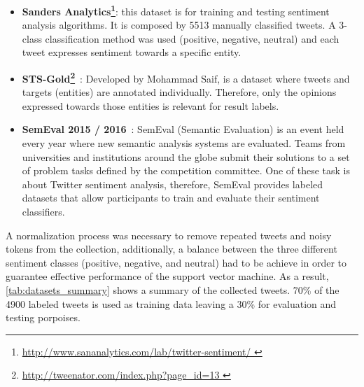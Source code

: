 \begin{itemize} 
\itemsep0em  

\item \textbf{Sanders Analytics\footnote{\url{http://www.sananalytics.com/lab/twitter-sentiment/
}}}:  this dataset is for training and testing sentiment analysis algorithms. It is composed by 5513 manually classified tweets. A 3-class classification method was used (positive, negative, neutral) and each tweet expresses sentiment towards a specific entity.  

\item \textbf{STS-Gold\footnote{\url{http://tweenator.com/index.php?page_id=13
}}}~\cite{saif2013evaluation}: Developed by Mohammad Saif, is a dataset where tweets and targets (entities) are annotated individually. Therefore, only the opinions expressed towards those entities is relevant for result labels.

\item \textbf{SemEval 2015 / 2016}~\cite{rosenthal2015semeval}: SemEval (Semantic Evaluation) is an event held every year where new semantic analysis systems are evaluated. Teams from universities and institutions around the globe submit their solutions to a set of problem tasks defined by the competition committee. One of these task is about Twitter sentiment analysis, therefore, SemEval provides labeled datasets that allow participants to train and evaluate their sentiment classifiers.


\end{itemize}

A normalization process was necessary to remove repeated tweets and noisy tokens from the collection, additionally, a balance between the three different sentiment classes (positive, negative, and neutral) had to be achieve in order to guarantee effective performance of the support vector machine. As a result, \autoref{tab:datasets_summary} shows a summary of the collected tweets. 70\% of the 4900 labeled tweets is used as training data leaving a 30\% for evaluation and testing porpoises. 

